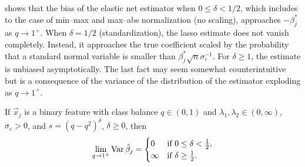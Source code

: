  shows that the bias of the elastic net estimator when \(0 \leq \delta < 1/2\), which includes to the case of min--max and max--abs normalization (no scaling), approaches
\(-\beta_j^*\) as \(q \rightarrow 1^+\). When \(\delta = 1/2\) (standardization), the lasso estimate does not vanish completely. Instead, it approaches the
true coefficient scaled by the probability that a standard normal variable is smaller than \(\beta_j^*\sqrt{n}\sigma_\varepsilon^{-1}\). For \(\delta \geq 1\), the
estimate is unbiased asymptotically. The last fact may seem somewhat counterintuitive but is a consequence of the variance of the distribution of the estimator exploding as \(q \rightarrow 1^+\).

\begin{theorem}
  If \(\vec{x}_j\) is a binary feature with class balance \(q \in (0, 1)\) and \(\lambda_1,\lambda_2 \in (0,\infty)\), \(\sigma_\varepsilon > 0\), and \(s = (q - q^2)^{\delta}\), \(\delta \geq 0\), then
  \[
    \lim_{q \rightarrow 1^+} \operatorname{Var} \hat{\beta}_j =
    \begin{cases}
      0      & \text{if } 0 \leq \delta < \frac{1}{2}, \\
      \infty & \text{if } \delta \geq \frac{1}{2}.
    \end{cases}
  \]
\end{theorem}

